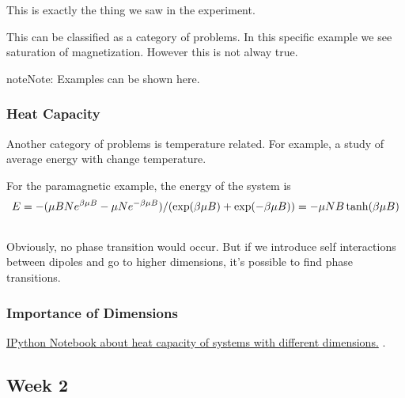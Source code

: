\documentclass[letterpaper,10pt,english]{sphinxmanual}
\begin{document}
This is exactly the thing we saw in the experiment.

This can be classified as a category of problems. In this specific example we see saturation of magnetization. However this is not alway true.

\begin{notice}{note}{Note:}
Examples can be shown here.
\end{notice}


\subsubsection{Heat Capacity}
\label{equilibrium/week1:heat-capacity}
Another category of problems is temperature related. For example, a study of average energy with change temperature.

For the paramagnetic example, the energy of the system is
\begin{gather}
\begin{split}E = -(\mu B N e^{\beta \mu B} - \mu N e^{-\beta \mu B})/(\exp(\beta \mu B) + \exp(-\beta \mu B)) = -\mu N B \tanh (\beta \mu B)\end{split}\notag\\\begin{split}\end{split}\notag
\end{gather}
Obviously, no phase transition would occur. But if we introduce self interactions between dipoles and go to higher dimensions, it's possible to find phase transitions.


\subsubsection{Importance of Dimensions}
\label{equilibrium/week1:importance-of-dimensions}
\href{http://nbviewer.ipython.org/github/emptymalei/StatisticalPhysics/blob/master/equilibrium/homework/StatMech\_HW1.ipynb}{IPython Notebook about heat capacity of systems with different dimensions.} .


\subsection{Week 2}
\label{equilibrium/week2::doc}\label{equilibrium/week2:week-2}
\end{document}
